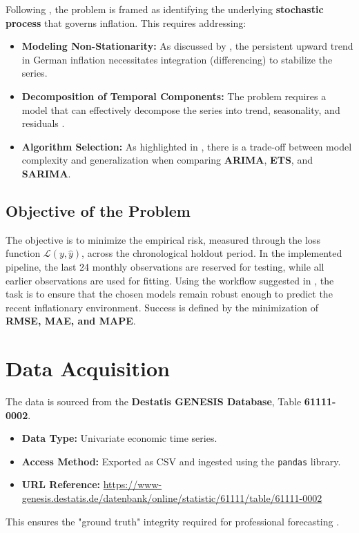 Following \cite{Box2015}, the problem is framed as identifying the underlying \textbf{stochastic process} that governs inflation. This requires addressing:

\begin{itemize}
	\item \textbf{Modeling Non-Stationarity:} As discussed by \cite{Shumway2017}, the persistent upward trend in German inflation necessitates integration (differencing) to stabilize the series. 
	\item \textbf{Decomposition of Temporal Components:} The problem requires a model that can effectively decompose the series into trend, seasonality, and residuals \cite{Hyndman2021}.
	\item \textbf{Algorithm Selection:} As highlighted in \cite{Hastie2009}, there is a trade-off between model complexity and generalization when comparing \textbf{ARIMA}, \textbf{ETS}, and \textbf{SARIMA}.
\end{itemize}

\subsection{Objective of the Problem}
The objective is to minimize the empirical risk, measured through the loss function $\mathcal{L}(y, \hat{y})$, across the chronological holdout period. In the implemented pipeline, the last 24 monthly observations are reserved for testing, while all earlier observations are used for fitting. Using the workflow suggested in \cite{Brownlee2017}, the task is to ensure that the chosen models remain robust enough to predict the recent inflationary environment. Success is defined by the minimization of \textbf{RMSE, MAE, and MAPE}.

\section{Data Acquisition}

The data is sourced from the \textbf{Destatis GENESIS Database}, Table \textbf{61111-0002}. 
\begin{itemize}
	\item \textbf{Data Type:} Univariate economic time series.
	\item \textbf{Access Method:} Exported as CSV and ingested using the \texttt{pandas} library.
	\item \textbf{URL Reference:} \url{https://www-genesis.destatis.de/datenbank/online/statistic/61111/table/61111-0002}
\end{itemize}
This ensures the "ground truth" integrity required for professional forecasting \cite{MachineLearningRisk:2021}.

